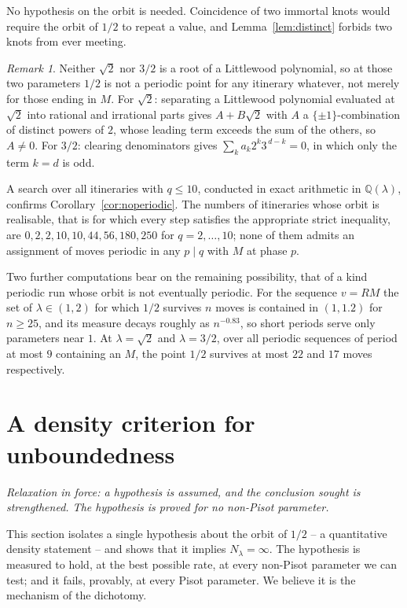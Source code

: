 \documentclass[11pt,reqno]{amsart}
\theoremstyle{plain}
\theoremstyle{definition}
\theoremstyle{remark}
\newtheorem{remark}[theorem]{Remark}
\newcommand{\Q}{\mathbb{Q}}
\begin{document}
No hypothesis on the orbit is needed. Coincidence of two immortal knots would
require the orbit of $1/2$ to repeat a value, and Lemma~\ref{lem:distinct}
forbids two knots from ever meeting.

\begin{remark}
Neither $\sqrt2$ nor $3/2$ is a root of a Littlewood polynomial, so at those two
parameters $1/2$ is not a periodic point for any itinerary whatever, not merely
for those ending in $M$. For $\sqrt2$: separating a Littlewood polynomial
evaluated at $\sqrt2$ into rational and irrational parts gives $A+B\sqrt2$ with
$A$ a $\{\pm1\}$-combination of distinct powers of $2$, whose leading term
exceeds the sum of the others, so $A\neq0$. For $3/2$: clearing denominators
gives $\sum_k a_k2^k3^{\,d-k}=0$, in which only the term $k=d$ is odd.
\end{remark}

A search over all itineraries with $q\leq10$, conducted in exact arithmetic in
$\Q(\lambda)$, confirms Corollary~\ref{cor:noperiodic}. The numbers of
itineraries whose orbit is realisable, that is for which every step satisfies
the appropriate strict inequality, are $0,2,2,10,10,44,56,180,250$ for
$q=2,\dots,10$; none of them admits an assignment of moves periodic in any
$p\mid q$ with $M$ at phase $p$.

Two further computations bear on the remaining possibility, that of a kind
periodic run whose orbit is not eventually periodic. For the sequence
$v=RM$ the set of $\lambda\in(1,2)$ for which $1/2$ survives $n$ moves is
contained in $(1,1.2)$ for $n\geq25$, and its measure decays roughly as
$n^{-0.83}$, so short periods serve only parameters near $1$. At
$\lambda=\sqrt2$ and $\lambda=3/2$, over all periodic sequences of period at
most $9$ containing an $M$, the point $1/2$ survives at most $22$ and $17$ moves
respectively.



\section{A density criterion for unboundedness}\label{sec:density}

\emph{Relaxation in force: a hypothesis is assumed, and the conclusion sought
is strengthened. The hypothesis is proved for no non-Pisot parameter.}

This section isolates a single hypothesis about the orbit of $1/2$ -- a
quantitative density statement -- and shows that it implies
$N_\lambda=\infty$. The hypothesis is measured to hold, at the best possible
rate, at every non-Pisot parameter we can test; and it fails, provably, at
every Pisot parameter. We believe it is the mechanism of the dichotomy.
\end{document}
